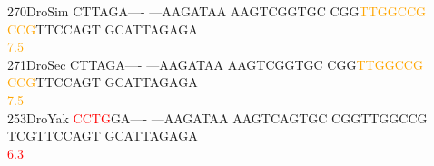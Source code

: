 \documentclass[11pt,twoside,reqno,a4paper]{article}
\begin{document}
{270\hspace*{1\charwidth}DroSim	CTTAGA----	---AAGATAA	AAGTCGGTGC	CGG\textcolor{orange}{T}\textcolor{orange}{T}\textcolor{orange}{G}\textcolor{orange}{G}\textcolor{orange}{C}\textcolor{orange}{C}\textcolor{orange}{G}	\textcolor{orange}{C}\textcolor{orange}{C}\textcolor{orange}{G}TTCCAGT	GCATTAGAGA	\\
\hspace*{4\charwidth}\hspace*{7\charwidth}\hspace*{1\charwidth}\hspace*{1\charwidth}\hspace*{1\charwidth}\hspace*{33\charwidth}\textcolor{orange}{7.5}\hspace*{1\charwidth}\hspace*{1\charwidth}\hspace*{1\charwidth}\\
271\hspace*{1\charwidth}DroSec	CTTAGA----	---AAGATAA	AAGTCGGTGC	CGG\textcolor{orange}{T}\textcolor{orange}{T}\textcolor{orange}{G}\textcolor{orange}{G}\textcolor{orange}{C}\textcolor{orange}{C}\textcolor{orange}{G}	\textcolor{orange}{C}\textcolor{orange}{C}\textcolor{orange}{G}TTCCAGT	GCATTAGAGA	\\
\hspace*{4\charwidth}\hspace*{7\charwidth}\hspace*{1\charwidth}\hspace*{1\charwidth}\hspace*{1\charwidth}\hspace*{33\charwidth}\textcolor{orange}{7.5}\hspace*{1\charwidth}\hspace*{1\charwidth}\hspace*{1\charwidth}\\
253\hspace*{1\charwidth}DroYak	\textcolor{red}{C}\textcolor{red}{C}\textcolor{red}{T}\textcolor{red}{G}GA----	---AAGATAA	AAGTCAGTGC	CGGTTGGCCG	TCGTTCCAGT	GCATTAGAGA	\\
\hspace*{4\charwidth}\hspace*{7\charwidth}\hspace*{0\charwidth}\textcolor{red}{6.3}\hspace*{1\charwidth}\hspace*{1\charwidth}\hspace*{1\charwidth}\hspace*{1\charwidth}\hspace*{1\charwidth}\hspace*{1\charwidth}\\
}
\end{document}

